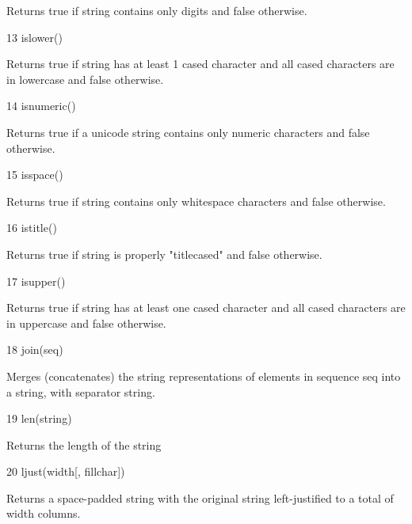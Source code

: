\vspace{12pt}
Returns true if string contains only digits and false otherwise. \par
13 \hspace*{0.5in} islower() \par
\vspace{12pt}
Returns true if string has at least 1 cased character and all cased characters are in lowercase and false otherwise. \par
14 \hspace*{0.5in} isnumeric() \par
\vspace{12pt}
Returns true if a unicode string contains only numeric characters and false otherwise. \par
15 \hspace*{0.5in} isspace() \par
\vspace{12pt}
Returns true if string contains only whitespace characters and false otherwise. \par
16 \hspace*{0.5in} istitle() \par
\vspace{12pt}
Returns true if string is properly "titlecased" and false otherwise. \par
17 \hspace*{0.5in} isupper() \par
\vspace{12pt}
Returns true if string has at least one cased character and all cased characters are in uppercase and false otherwise. \par
18 \hspace*{0.5in} join(seq) \par
\vspace{12pt}
Merges (concatenates) the string representations of elements in sequence seq into a string, with separator string. \par
19 \hspace*{0.5in} len(string) \par
\vspace{12pt}
Returns the length of the string \par
20 \hspace*{0.5in} ljust(width[, fillchar]) \par
\vspace{12pt}
Returns a space-padded string with the original string left-justified to a total of width columns. \par
